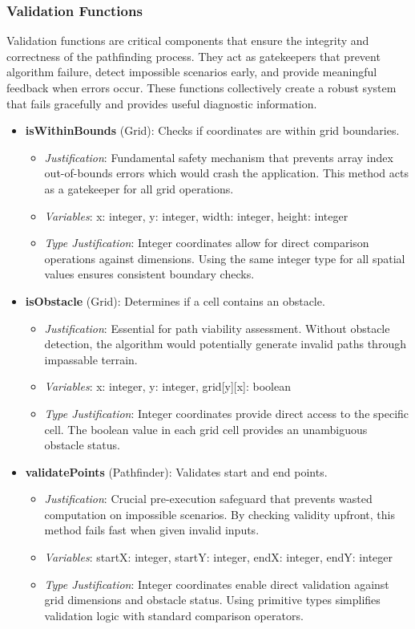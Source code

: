 \subsubsection*{Validation Functions}
Validation functions are critical components that ensure the integrity and correctness of the pathfinding process. They act as gatekeepers that prevent algorithm failure, detect impossible scenarios early, and provide meaningful feedback when errors occur. These functions collectively create a robust system that fails gracefully and provides useful diagnostic information.

\begin{itemize}
  \item \textbf{isWithinBounds} (Grid): Checks if coordinates are within grid boundaries.
    \begin{itemize}
      \item \textit{Justification}: Fundamental safety mechanism that prevents array index out-of-bounds errors which would crash the application. This method acts as a gatekeeper for all grid operations.
      \item \textit{Variables}: x: integer, y: integer, width: integer, height: integer
      \item \textit{Type Justification}: Integer coordinates allow for direct comparison operations against dimensions. Using the same integer type for all spatial values ensures consistent boundary checks.
    \end{itemize}
    
  \item \textbf{isObstacle} (Grid): Determines if a cell contains an obstacle.
    \begin{itemize}
      \item \textit{Justification}: Essential for path viability assessment. Without obstacle detection, the algorithm would potentially generate invalid paths through impassable terrain.
      \item \textit{Variables}: x: integer, y: integer, grid[y][x]: boolean
      \item \textit{Type Justification}: Integer coordinates provide direct access to the specific cell. The boolean value in each grid cell provides an unambiguous obstacle status.
    \end{itemize}
    
  \item \textbf{validatePoints} (Pathfinder): Validates start and end points.
    \begin{itemize}
      \item \textit{Justification}: Crucial pre-execution safeguard that prevents wasted computation on impossible scenarios. By checking validity upfront, this method fails fast when given invalid inputs.
      \item \textit{Variables}: startX: integer, startY: integer, endX: integer, endY: integer
      \item \textit{Type Justification}: Integer coordinates enable direct validation against grid dimensions and obstacle status. Using primitive types simplifies validation logic with standard comparison operators.
    \end{itemize}
\end{itemize}

